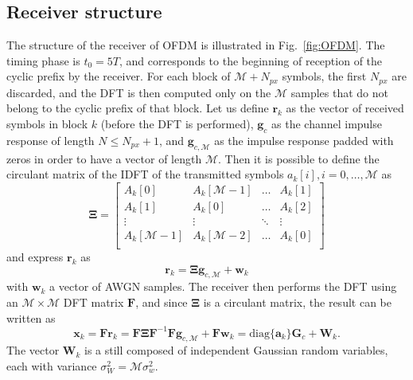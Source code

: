 \documentclass[10pt]{article}
\newcommand{\ofdM} {\mathcal{M}}
\newcommand{\DFTmat} {\mathbf{F}}
\begin{document}
\subsection*{Receiver structure}
The structure of the receiver of OFDM is illustrated in Fig.~\ref{fig:OFDM}. The timing phase is $t_0 = 5 T$, and corresponds to the beginning of reception of the cyclic prefix by the receiver. For each block of $\ofdM + N_{px}$ symbols, the first $N_{px}$ are discarded, and the DFT is then computed only on the $\ofdM$ samples that do not belong to the cyclic prefix of that block. Let us define $\mathbf{r}_k$ as the vector of received symbols in block $k$ (before the DFT is performed), $\mathbf{g}_c$ as the channel impulse response of length $N \le N_{px} + 1$, and $\mathbf{g}_{c,\ofdM}$ as the impulse response padded with zeros in order to have a vector of length $\ofdM$. Then it is possible to define the circulant matrix of the IDFT of the transmitted symbols $a_k[i], i = 0, \dots, \ofdM$ as
\begin{equation}
	\boldsymbol{\Xi} = 
	\begin{bmatrix}
		A_k[0] & A_k[\ofdM - 1] & \dots & A_k[1] \\
		A_k[1] & A_k[0] & \dots & A_k[2] \\
		\vdots & \vdots & \ddots & \vdots \\
		A_k[\ofdM - 1] & A_k[\ofdM - 2] & \dots & A_k[0] \\
	\end{bmatrix}
\end{equation}
and express $\mathbf{r}_k$ as
\begin{equation}
	\mathbf{r}_k = \boldsymbol{\Xi} \mathbf{g}_{c,\ofdM} + \mathbf{w}_k
\end{equation}
with $\mathbf{w}_k$ a vector of AWGN samples. %
The receiver then performs the DFT using an $\ofdM \times \ofdM$ DFT matrix $\DFTmat$, and since $\boldsymbol{\Xi}$ is a circulant matrix, the result can be written as
\begin{equation}
	 \mathbf{x}_k = \DFTmat \mathbf{r}_k = \DFTmat \boldsymbol{\Xi} \DFTmat^{-1} \DFTmat \mathbf{g}_{c,\ofdM} + \DFTmat \mathbf{w}_k = \mathrm{diag}\{\mathbf{a}_k\} \mathbf{G}_c + \mathbf{W}_k.
\end{equation}
The vector $\mathbf{W}_k$ is a still composed of independent Gaussian random variables, each with variance $\sigma_W^2 = \ofdM \sigma_w^2$. 
\end{document}
